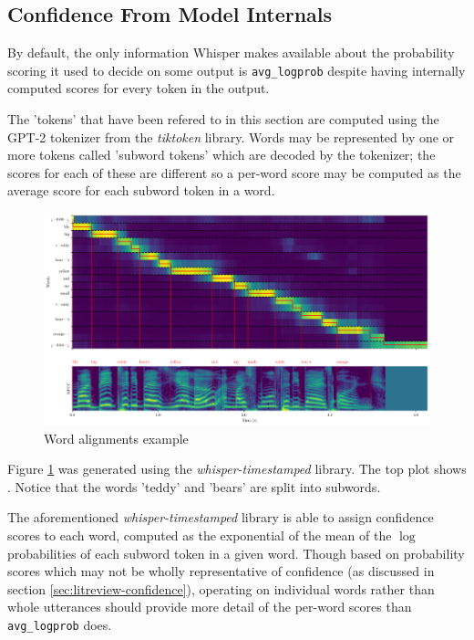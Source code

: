 \subsection{Confidence From Model Internals}

By default, the only information Whisper makes available about the probability scoring it used to decide on some output is \texttt{avg\_logprob} despite having internally computed scores for every token in the output.

The 'tokens' that have been refered to in this section are computed using the GPT-2 tokenizer from the \emph{tiktoken} library\cite{tiktoken}.
Words may be represented by one or more tokens called 'subword tokens' which are decoded by the tokenizer; the scores for each of these are different so a per-word score may be computed as the average score for each subword token in a word.

\begin{figure}[H]
  \centering
  \includegraphics[width=\textwidth]{images/mfcc-with-words.png}
  \caption{Word alignments example}
  \label{fig:word-alignments-example}
\end{figure}

Figure \ref{fig:word-alignments-example} was generated using the \emph{whisper-timestamped} library\cite{whisper-timestamped, whisper-ts-dtw-paper, whisper}.
The top plot shows \cite{whisper-timestamped}.
Notice that the words 'teddy' and 'bears' are split into subwords.

The aforementioned \emph{whisper-timestamped} library is able to assign confidence scores to each word, computed as the exponential of the mean of the $\log$ probabilities of each subword token in a given word.
Though based on probability scores which may not be wholly representative of confidence (as discussed in section \ref{sec:litreview-confidence}), operating on individual words rather than whole utterances should provide more detail of the per-word scores than \texttt{avg\_logprob} does.

